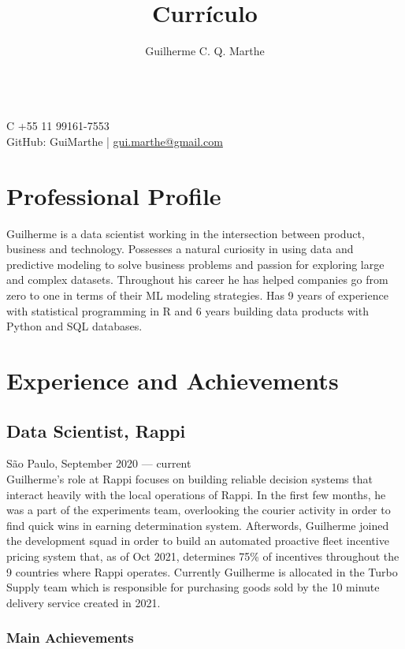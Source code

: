 \documentclass{article}
\author{Guilherme C. Q. Marthe}
\title{Currículo}
\makeatletter
\renewcommand{\maketitle}{
\begin{flushleft}
	{\huge\theauthor}
	\vspace{0.2em}\\
	C +55 11 99161-7553\\
	GitHub: GuiMarthe | \href{mailto:gui.marthe@gmail.com}{gui.marthe@gmail.com}
\end{flushleft}
}
\newcommand{\jobdate}[3]{
\large
\vspace{0.05em} 
  {#1, #2 --- #3}
\vspace{0.5em} 
\\
}
\makeatother
\begin{document}
\maketitle

\section{Professional Profile}

 \linespread{.99}\large{Guilherme is a data scientist working in the intersection between product, business and technology. Possesses a natural curiosity in using data and predictive modeling to solve business problems and passion for exploring large and complex datasets. Throughout his career he has helped companies go from zero to one in terms of their ML modeling strategies. Has 9 years of experience with statistical programming in R and 6 years building data products with Python and SQL databases.}

\section{Experience and Achievements}

\subsection{Data Scientist, Rappi}
\jobdate{São Paulo}{September 2020}{current}

Guilherme's role at Rappi focuses on building reliable decision systems that interact heavily with the local operations of Rappi. In the first few months, he was a part of the experiments team, overlooking the courier activity in order to find quick wins in earning determination system. Afterwords, Guilherme joined the development squad in order to build an automated proactive fleet incentive pricing system that, as of Oct 2021, determines 75\% of incentives throughout the 9 countries where Rappi operates. Currently Guilherme is allocated in the Turbo Supply team which is responsible for purchasing goods sold by the 10 minute delivery service created in 2021.

\subsubsection{Main Achievements}
\end{document}
